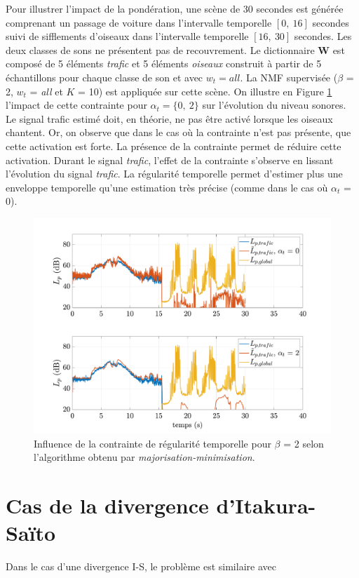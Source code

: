 Pour illustrer l'impact de la pondération, une scène de 30 secondes est générée comprenant un passage de voiture dans l'intervalle temporelle $\left[0,~16 \right]$ secondes suivi de sifflements d'oiseaux dans l'intervalle temporelle $\left[16,~30 \right]$ secondes. Les deux classes de sons ne présentent pas de recouvrement. Le dictionnaire $\mathbf{W}$ est composé de 5 éléments \textit{trafic} et 5 éléments \textit{oiseaux} construit à partir de 5 échantillons pour chaque classe de son et avec $w_t = all$. La NMF supervisée ($\beta$ = 2, $w_t$ = \textit{all} et $K$ = 10) est appliquée sur cette scène. On illustre en Figure \ref{fig:smooth_2} l'impact de cette contrainte pour $\alpha_t = \lbrace 0,~2\rbrace$ sur l'évolution du niveau sonores. Le signal trafic estimé doit, en théorie, ne pas être activé lorsque les oiseaux chantent. Or, on observe que dans le cas où la contrainte n'est pas présente, que cette activation est forte. La présence de la contrainte permet de réduire cette activation. Durant le signal \textit{trafic}, l'effet de la contrainte s'observe en lissant l'évolution du signal \textit{trafic}. La régularité temporelle permet d'estimer plus une enveloppe temporelle qu'une estimation très précise (comme dans le cas où $\alpha_t$ = 0).

\begin{figure}[h]
\centering
\includegraphics[width=.9\linewidth]{./figures/NMF/LpSmooth_2.pdf}
\caption{Influence de la contrainte de régularité temporelle pour $\beta$ = 2 selon l'algorithme obtenu par \textit{majorisation-minimisation}.}
\label{fig:smooth_2}
\end{figure}


\section{Cas de la divergence d'Itakura-Saïto}
Dans le cas d'une divergence I-S, le problème est similaire avec

